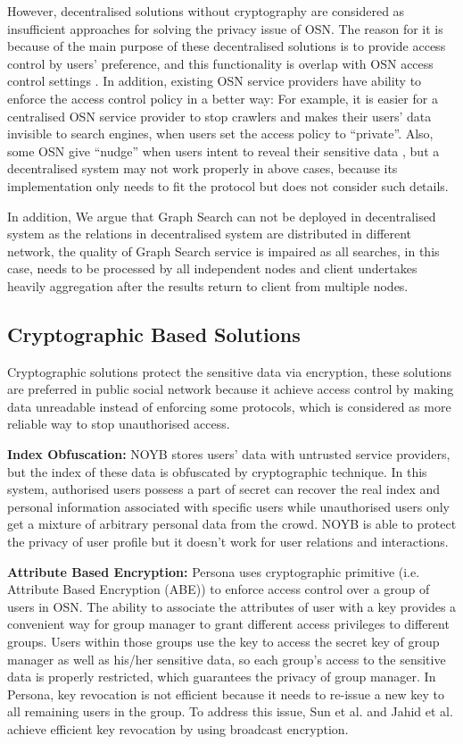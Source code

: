 However, decentralised solutions without cryptography are considered as insufficient approaches for solving the privacy issue of OSN. The reason for it is because of the main purpose of these decentralised solutions is to provide access control by users' preference, and this functionality is overlap with OSN access control settings \cite{narayanan2012critical}. In addition, existing OSN service providers have ability to enforce the access control policy in a better way: For example, it is easier for a centralised OSN service provider to stop crawlers and makes their users' data invisible to search engines, when users set the access policy to ``private''. Also, some OSN give ``nudge''  when users intent to reveal their sensitive data \cite{mori2010nudge}, but a decentralised system may not work properly in above cases, because its implementation only needs to fit the protocol but does not consider such details.

In addition, We argue that Graph Search can not be deployed in decentralised system as the relations in decentralised system are distributed in different network, the quality of Graph Search service is impaired as all searches, in this case, needs to be processed by all independent nodes and client undertakes heavily aggregation after the results return to client from multiple nodes.

\subsection{Cryptographic Based Solutions}
Cryptographic solutions protect the sensitive data via encryption, these solutions are preferred in public social network because it achieve access control by making data unreadable instead of enforcing some protocols, which is considered as more reliable way to stop unauthorised access.

{\bf Index Obfuscation:} NOYB \cite{guha2008noyb} stores users' data with untrusted service providers, but the index of these data is obfuscated by cryptographic technique. In this system, authorised users possess a part of secret can recover the real index and personal information associated with specific users while unauthorised users only get a mixture of arbitrary personal data from the crowd. NOYB is able to protect the privacy of user profile but it doesn't work for user relations and interactions. 

{\bf Attribute Based Encryption:} Persona \cite{baden2009persona} uses cryptographic primitive (i.e. Attribute Based Encryption (ABE)) to enforce access control over a group of users in OSN. The ability to associate the attributes of user with a key provides a convenient way for group manager to grant different access privileges to different groups. Users within those groups use the key to access the secret key of group manager as well as his/her sensitive data, so each group's access to the sensitive data is properly restricted, which guarantees the privacy of group manager. 
In Persona, key revocation is not efficient because it needs to re-issue a new key to all remaining users in the group. To address this issue, Sun et al. \cite{sun2010privacy} and Jahid et al. \cite{jahid2011easier} achieve efficient key revocation by using broadcast encryption.

